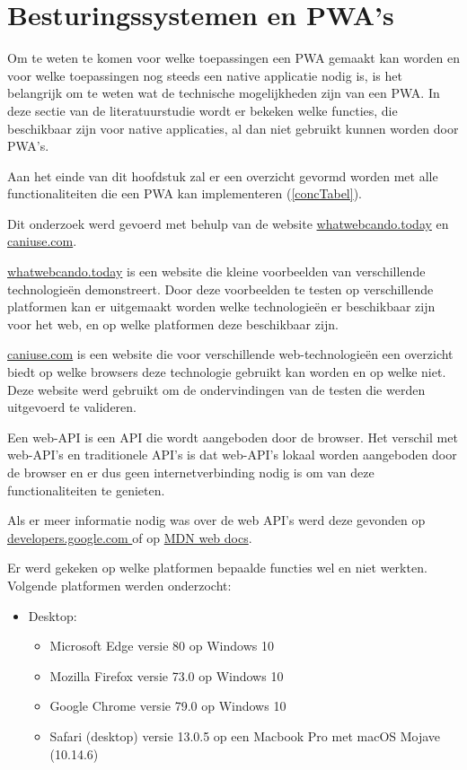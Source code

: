 \clearpage
\section{Besturingssystemen en PWA's}
	\label{ch: BesturingssystemenEnPWAs}
	
	Om te weten te komen voor welke toepassingen een PWA gemaakt kan worden en voor welke toepassingen nog steeds een native applicatie nodig is, is het belangrijk om te weten wat de technische mogelijkheden zijn van een PWA. In deze sectie van de literatuurstudie wordt er bekeken welke functies, die beschikbaar zijn voor native applicaties, al dan niet gebruikt kunnen worden door PWA's.
	
	Aan het einde van dit hoofdstuk zal er een overzicht gevormd worden met alle functionaliteiten die een PWA kan implementeren (\ref{concTabel}).
	
	Dit onderzoek werd gevoerd met behulp van de website \href{https://whatwebcando.today/}{whatwebcando.today} en
	\href{https://caniuse.com/}{caniuse.com}.
	
	                                 
	\href{https://whatwebcando.today/}{whatwebcando.today} is een website die kleine voorbeelden van verschillende technologieën demonstreert. Door deze voorbeelden te testen op verschillende platformen kan er uitgemaakt worden welke technologieën er beschikbaar zijn voor het web, en op welke platformen deze beschikbaar zijn.
	
	\href{https://caniuse.com/}{ caniuse.com} is een website die voor verschillende web-technologieën een overzicht biedt op welke browsers deze technologie gebruikt kan worden en op welke niet. Deze website werd gebruikt om de ondervindingen van de testen die werden uitgevoerd te valideren. 
	
	Een web-API is een API die wordt aangeboden door de browser. Het verschil met web-API's en traditionele API's is dat web-API's lokaal worden aangeboden door de browser en er dus geen internetverbinding nodig is om van deze functionaliteiten te genieten.
	\autocite{Mozilla2019c}
	
	
	Als er meer informatie nodig was over de web API's werd deze gevonden op \href{https://developers.google.com/}{developers.google.com } of op \href{https://developer.mozilla.org/nl/}{MDN web docs}.
	
	Er werd gekeken op welke platformen bepaalde functies wel en niet werkten. Volgende platformen werden onderzocht:
	\begin{itemize}
	   \item Desktop:
	   \begin{itemize}
	     \item	Microsoft Edge versie 80 op Windows 10
	     \item	Mozilla Firefox versie 73.0 op Windows 10
	     \item	Google Chrome versie 79.0 op Windows 10
	     \item  Safari (desktop) versie 13.0.5 op een Macbook Pro met macOS Mojave (10.14.6)
	   \end{itemize}
	\end{itemize}
	

